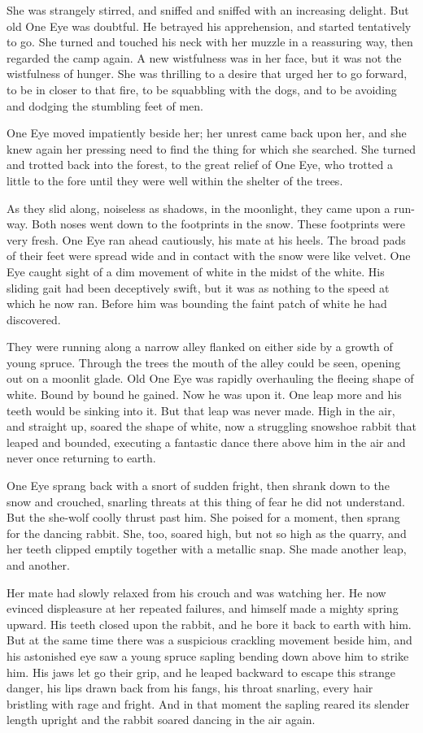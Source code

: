 \documentclass[10pt]{book}
\begin{document}
She was strangely stirred, and sniffed and sniffed with an increasing
delight. But old One Eye was doubtful. He betrayed his apprehension,
and started tentatively to go. She turned and touched his neck with her
muzzle in a reassuring way, then regarded the camp again. A new
wistfulness was in her face, but it was not the wistfulness of hunger.
She was thrilling to a desire that urged her to go forward, to be in
closer to that fire, to be squabbling with the dogs, and to be avoiding
and dodging the stumbling feet of men.

One Eye moved impatiently beside her; her unrest came back upon her,
and she knew again her pressing need to find the thing for which she
searched. She turned and trotted back into the forest, to the great
relief of One Eye, who trotted a little to the fore until they were
well within the shelter of the trees.

As they slid along, noiseless as shadows, in the moonlight, they came
upon a run-way. Both noses went down to the footprints in the snow.
These footprints were very fresh. One Eye ran ahead cautiously, his
mate at his heels. The broad pads of their feet were spread wide and in
contact with the snow were like velvet. One Eye caught sight of a dim
movement of white in the midst of the white. His sliding gait had been
deceptively swift, but it was as nothing to the speed at which he now
ran. Before him was bounding the faint patch of white he had
discovered.

They were running along a narrow alley flanked on either side by a
growth of young spruce. Through the trees the mouth of the alley could
be seen, opening out on a moonlit glade. Old One Eye was rapidly
overhauling the fleeing shape of white. Bound by bound he gained. Now
he was upon it. One leap more and his teeth would be sinking into it.
But that leap was never made. High in the air, and straight up, soared
the shape of white, now a struggling snowshoe rabbit that leaped and
bounded, executing a fantastic dance there above him in the air and
never once returning to earth.

One Eye sprang back with a snort of sudden fright, then shrank down to
the snow and crouched, snarling threats at this thing of fear he did
not understand. But the she-wolf coolly thrust past him. She poised for
a moment, then sprang for the dancing rabbit. She, too, soared high,
but not so high as the quarry, and her teeth clipped emptily together
with a metallic snap. She made another leap, and another.

Her mate had slowly relaxed from his crouch and was watching her. He
now evinced displeasure at her repeated failures, and himself made a
mighty spring upward. His teeth closed upon the rabbit, and he bore it
back to earth with him. But at the same time there was a suspicious
crackling movement beside him, and his astonished eye saw a young
spruce sapling bending down above him to strike him. His jaws let go
their grip, and he leaped backward to escape this strange danger, his
lips drawn back from his fangs, his throat snarling, every hair
bristling with rage and fright. And in that moment the sapling reared
its slender length upright and the rabbit soared dancing in the air
again.
\end{document}
